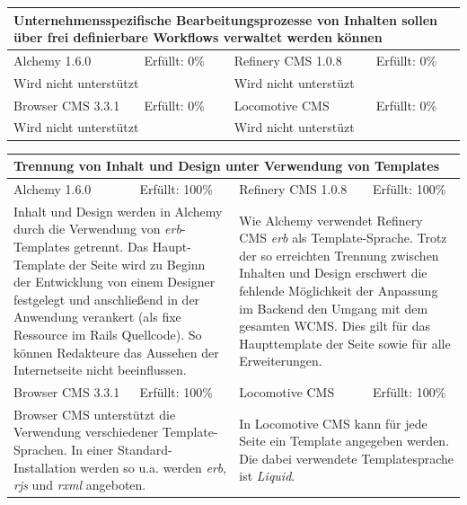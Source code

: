 \newline
\newline
\begin{tabular}[!ht]{|l|l|l|l|}
\hline
\multicolumn{4}{|p{15cm}|}{\textbf{Unternehmensspezifische Bearbeitungsprozesse von Inhalten sollen über frei definierbare Workflows verwaltet werden können}} \\
\hline
  Alchemy 1.6.0 & \cellcolor{red}Erfüllt: 0\% & Refinery CMS 1.0.8 & \cellcolor{red}Erfüllt: 0\% \\
  \hline
  \multicolumn{2}{|p{7.5cm}|}{Wird nicht unterstützt} & \multicolumn{2}{p{7.5cm}|}{Wird nicht unterstüzt} \\
  \hline
  Browser CMS 3.3.1 & \cellcolor{red}Erfüllt: 0\% & Locomotive CMS & \cellcolor{red}Erfüllt: 0\% \\
  \hline
  \multicolumn{2}{|p{7.5cm}|}{Wird nicht unterstützt} & \multicolumn{2}{p{7.5cm}|}{Wird nicht unterstüzt} \\
\hline
\end{tabular}
\newline
\newline
\newline
\begin{tabular}[!ht]{|l|l|l|l|}
\hline
\multicolumn{4}{|p{15cm}|}{\textbf{Trennung von Inhalt und Design unter Verwendung von Templates}} \\
\hline
  Alchemy 1.6.0 & \cellcolor{green}Erfüllt: 100\% & Refinery CMS 1.0.8 & \cellcolor{green}Erfüllt: 100\% \\
  \hline
  \multicolumn{2}{|p{7.5cm}|}{Inhalt und Design werden in Alchemy durch die Verwendung von \emph{erb}-Templates getrennt. Das Haupt-Template der Seite wird zu Beginn der Entwicklung von einem Designer festgelegt und anschließend in der Anwendung verankert (als fixe Ressource im Rails Quellcode). So können Redakteure das Aussehen der Internetseite nicht beeinflussen.} & \multicolumn{2}{p{7.5cm}|}{Wie Alchemy verwendet Refinery CMS \emph{erb} als Template-Sprache.
Trotz der so erreichten Trennung zwischen Inhalten und Design erschwert die fehlende Möglichkeit der Anpassung im Backend den Umgang mit dem gesamten WCMS. Dies gilt für das Haupttemplate der Seite sowie für alle Erweiterungen.} \\
  \hline
  Browser CMS 3.3.1 & \cellcolor{green}Erfüllt: 100\% & Locomotive CMS & \cellcolor{green}Erfüllt: 100\% \\
  \hline
  \multicolumn{2}{|p{7.5cm}|}{Browser CMS unterstützt die Verwendung verschiedener Template-Sprachen.
In einer Standard-Installation werden so u.a. werden \emph{erb}, \emph{rjs} und \emph{rxml} angeboten.} & \multicolumn{2}{p{7.5cm}|}{In Locomotive CMS kann für jede Seite ein Template angegeben werden. Die dabei verwendete Templatesprache ist \emph{Liquid}.} \\
\hline
\end{tabular}
